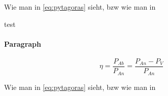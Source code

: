 Wie man in \eqref{eq:pytagoras} sieht, bzw wie man in 

\begin{table}
\caption{test}
\end{table}

\paragraph{Paragraph}
\label{sec:paragraph}
%
\begin{equation}
	\eta = \dfrac{P_{Ab}}{P_{An}} = \dfrac{P_{An}-P_{V}}{P_{An}}
\end{equation}
%
\begin{Gleichungsparameter}
\end{Gleichungsparameter}

Wie man in \eqref{eq:pytagoras} sieht, bzw wie man in 

